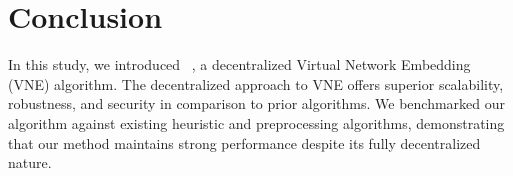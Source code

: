 \section{Conclusion}

In this study, we introduced \ourAlg~, a decentralized Virtual Network Embedding (VNE) algorithm. The decentralized approach to VNE offers superior scalability, robustness, and security in comparison to prior algorithms.
%
We benchmarked our algorithm against existing heuristic and preprocessing algorithms, demonstrating that our method maintains strong performance despite its fully decentralized nature.
%
